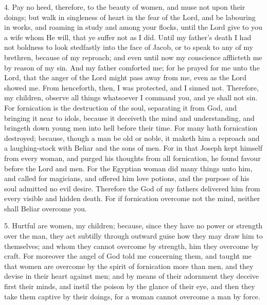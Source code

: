 4. Pay no heed, therefore, to the beauty of women, and muse not upon their doings; but walk in singleness of heart in the fear of the Lord, and be labouring in works, and roaming in study and among your flocks, until the Lord give to you a wife whom He will, that ye suffer not as I did. Until my father’s death I had not boldness to look stedfastly into the face of Jacob, or to speak to any of my brethren, because of my reproach; and even until now my conscience afflicteth me by reason of my sin. And my father comforted me; for he prayed for me unto the Lord, that the anger of the Lord might pass away from me, even as the Lord showed me. From henceforth, then, I was protected, and I sinned not. Therefore, my children, observe all things whatsoever I command you, and ye shall not sin. For fornication is the destruction of the soul, separating it from God, and bringing it near to idols, because it deceiveth the mind and understanding, and bringeth down young men into hell before their time. For many hath fornication destroyed; because, though a man be old or noble, it maketh him a reproach and a laughing-stock with Beliar and the sons of men. For in that Joseph kept himself from every woman, and purged his thoughts from all fornication, he found favour before the Lord and men. For the Egyptian woman did many things unto him, and called for magicians, and offered him love potions, and the purpose of his soul admitted no evil desire. Therefore the God of my fathers delivered him from every visible and hidden death. For if fornication overcome not the mind, neither shall Beliar overcome you.

5. Hurtful are women, my children; because, since they have no power or strength over the man, they act subtilly through outward guise how they may draw him to themselves; and whom they cannot overcome by strength, him they overcome by craft. For moreover the angel of God told me concerning them, and taught me that women are overcome by the spirit of fornication more than men, and they devise in their heart against men; and by means of their adornment they deceive first their minds, and instil the poison by the glance of their eye, and then they take them captive by their doings, for a woman cannot overcome a man by force.

